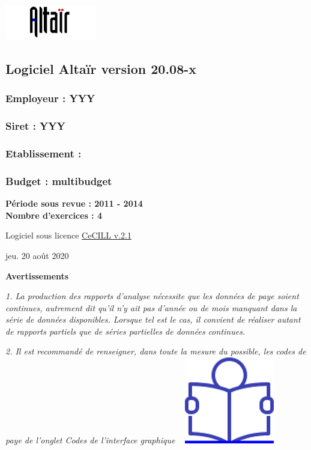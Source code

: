 \includegraphics{icones/altair.png}

\hypertarget{logiciel-altair-version-20.08-x}{%
\subsection{Logiciel Altaïr version
20.08-x}\label{logiciel-altair-version-20.08-x}}

\hypertarget{employeur-yyy}{%
\subsubsection{Employeur : YYY}\label{employeur-yyy}}

\hypertarget{siret-yyy}{%
\subsubsection{Siret : YYY}\label{siret-yyy}}

\hypertarget{etablissement}{%
\subsubsection{Etablissement :}\label{etablissement}}

\hypertarget{budget-multibudget}{%
\subsubsection{Budget : multibudget}\label{budget-multibudget}}

\textbf{Période sous revue : 2011 - 2014 }\\
\textbf{Nombre d'exercices : 4 }

Logiciel sous licence \href{../Docs/LICENCE.html}{CeCILL v.2.1}

jeu. 20 août 2020

\textbf{Avertissements}

\emph{1. La production des rapports d'analyse nécessite que les données
de paye soient continues, autrement dit qu'il n'y ait pas d'année ou de
mois manquant dans la série de données disponibles. Lorsque tel est le
cas, il convient de réaliser autant de rapports partiels que de séries
partielles de données continues.}

\emph{2. Il est recommandé de renseigner, dans toute la mesure du
possible, les codes de paye de l'onglet Codes de l'interface graphique}
~
\href{../Docs/Notices/fiche_onglet_codes.odt}{\includegraphics{icones/Notice.png}}

